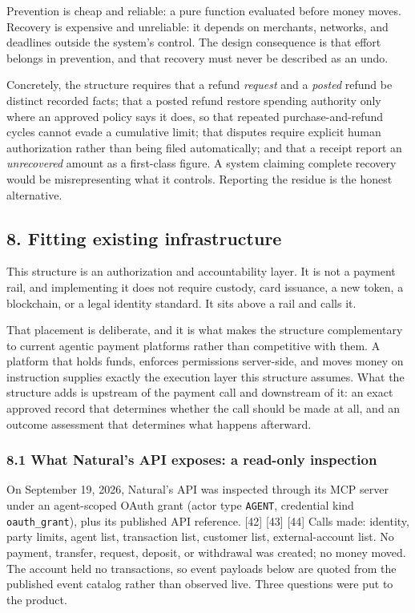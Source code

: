 \documentclass[
  11pt,
  letterpaper,
]{article}
\begin{document}
Prevention is cheap and reliable: a pure function evaluated before money
moves. Recovery is expensive and unreliable: it depends on merchants,
networks, and deadlines outside the system's control. The design
consequence is that effort belongs in prevention, and that recovery must
never be described as an undo.

Concretely, the structure requires that a refund \emph{request} and a
\emph{posted} refund be distinct recorded facts; that a posted refund
restore spending authority only where an approved policy says it does,
so that repeated purchase-and-refund cycles cannot evade a cumulative
limit; that disputes require explicit human authorization rather than
being filed automatically; and that a receipt report an
\emph{unrecovered} amount as a first-class figure. A system claiming
complete recovery would be misrepresenting what it controls. Reporting
the residue is the honest alternative.

\subsection{8. Fitting existing
infrastructure}\label{fitting-existing-infrastructure}

This structure is an authorization and accountability layer. It is not a
payment rail, and implementing it does not require custody, card
issuance, a new token, a blockchain, or a legal identity standard. It
sits above a rail and calls it.

That placement is deliberate, and it is what makes the structure
complementary to current agentic payment platforms rather than
competitive with them. A platform that holds funds, enforces permissions
server-side, and moves money on instruction supplies exactly the
execution layer this structure assumes. What the structure adds is
upstream of the payment call and downstream of it: an exact approved
record that determines whether the call should be made at all, and an
outcome assessment that determines what happens afterward.

\subsubsection{8.1 What Natural's API exposes: a read-only
inspection}\label{what-naturals-api-exposes-a-read-only-inspection}

On September 19, 2026, Natural's API was inspected through its MCP
server under an agent-scoped OAuth grant (actor type \texttt{AGENT},
credential kind \texttt{oauth\_grant}), plus its published API
reference. {[}42{]} {[}43{]} {[}44{]} Calls made: identity, party
limits, agent list, transaction list, customer list, external-account
list. No payment, transfer, request, deposit, or withdrawal was created;
no money moved. The account held no transactions, so event payloads
below are quoted from the published event catalog rather than observed
live. Three questions were put to the product.
\end{document}
